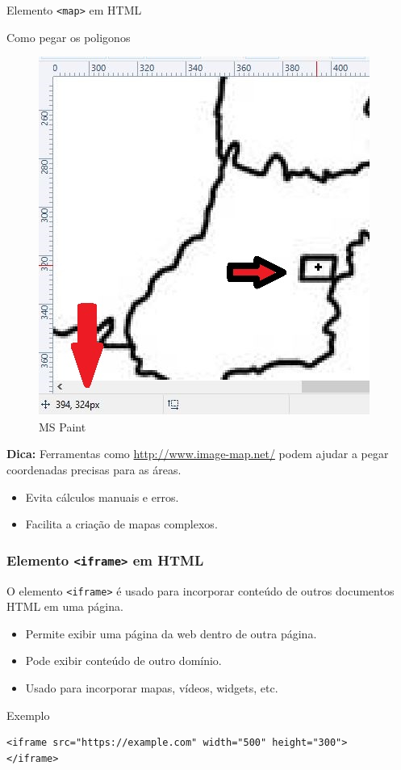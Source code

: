 \documentclass{beamer}
\begin{document}
\begin{frame}{Elemento \texttt{<map>} em HTML}

Como pegar os poligonos

\begin{figure}
    \centering
    \includegraphics[width=0.4\linewidth]{img/paint-map.JPG}
    \caption{MS Paint}
    \label{fig:enter-label}
\end{figure}

\textbf{Dica:} Ferramentas como \href{http://www.image-map.net/}{http://www.image-map.net/} podem ajudar a pegar coordenadas precisas para as áreas.

  \begin{itemize}
    \item Evita cálculos manuais e erros.
    \item Facilita a criação de mapas complexos.
  \end{itemize}

\end{frame}


\begin{frame}[fragile]
  \frametitle{Elemento \texttt{<iframe>} em HTML}

  O elemento \texttt{<iframe>} é usado para incorporar conteúdo de outros documentos HTML em uma página.

  \begin{itemize}
    \item Permite exibir uma página da web dentro de outra página.
    \item Pode exibir conteúdo de outro domínio.
    \item Usado para incorporar mapas, vídeos, widgets, etc.
  \end{itemize}

  \vspace{1em}

\begin{block}{Exemplo}
\begin{verbatim}
<iframe src="https://example.com" width="500" height="300">
</iframe>
\end{verbatim}    
\end{block}
  
\end{frame}
\end{document}
